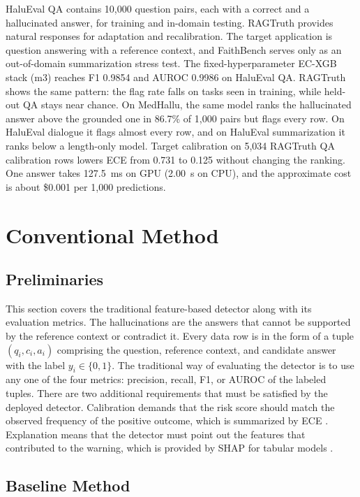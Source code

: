 \documentclass[a4paper,fleqn]{cas-sc}
\begin{document}
HaluEval QA contains 10,000 question pairs, each with a correct and a hallucinated answer, for training and in-domain testing. RAGTruth provides natural responses for adaptation and recalibration. The target application is question answering with a reference context, and FaithBench serves only as an out-of-domain summarization stress test. The fixed-hyperparameter EC-XGB stack (m3) reaches F1 0.9854 and AUROC 0.9986 on HaluEval QA. RAGTruth shows the same pattern: the flag rate falls on tasks seen in training, while held-out QA stays near chance. On MedHallu, the same model ranks the hallucinated answer above the grounded one in 86.7\% of 1,000 pairs but flags every row. On HaluEval dialogue it flags almost every row, and on HaluEval summarization it ranks below a length-only model. Target calibration on 5,034 RAGTruth QA calibration rows lowers ECE from 0.731 to 0.125 without changing the ranking. One answer takes 127.5~ms on GPU (2.00~s on CPU), and the approximate cost is about \$0.001 per 1,000 predictions.

\section{Conventional Method}\label{sec:conventional}

\subsection{Preliminaries}

This section covers the traditional feature-based detector along with its evaluation metrics. The hallucinations are the answers that cannot be supported by the reference context or contradict it. Every data row is in the form of a tuple $(q_i,c_i,a_i)$ comprising the question, reference context, and candidate answer with the label $y_i \in \{0,1\}$. The traditional way of evaluating the detector is to use any one of the four metrics: precision, recall, F1, or AUROC of the labeled tuples. There are two additional requirements that must be satisfied by the deployed detector. Calibration demands that the risk score should match the observed frequency of the positive outcome, which is summarized by ECE \cite{guo}. Explanation means that the detector must point out the features that contributed to the warning, which is provided by SHAP for tabular models \cite{shap}.

\subsection{Baseline Method}
\end{document}
